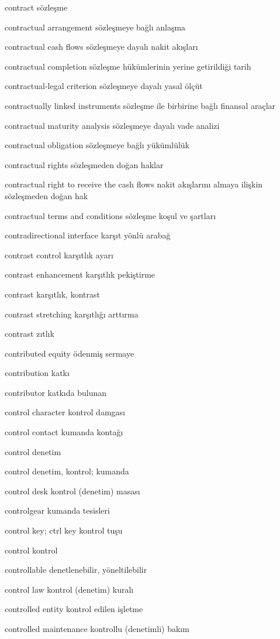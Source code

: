\documentclass[12pt,fleqn]{article}\usepackage{../../common}
\begin{document}
contract sözleşme

contractual arrangement sözleşmeye bağlı anlaşma

contractual cash flows sözleşmeye dayalı nakit akışları

contractual completion sözleşme hükümlerinin yerine getirildiği tarih

contractual-legal criterion sözleşmeye dayalı yasal ölçüt

contractually linked instruments sözleşme ile birbirine bağlı finansal araçlar

contractual maturity analysis sözleşmeye dayalı vade analizi

contractual obligation sözleşmeye bağlı yükümlülük

contractual rights sözleşmeden doğan haklar

contractual right to receive the cash flows nakit akışlarını almaya ilişkin sözleşmeden doğan hak

contractual terms and conditions sözleşme koşul ve şartları

contradirectional interface karşıt yönlü arabağ

contrast control karşıtlık ayarı

contrast enhancement karşıtlık pekiştirme

contrast karşıtlık, kontrast

contrast stretching karşıtlığı arttırma

contrast zıtlık

contributed equity ödenmiş sermaye

contribution katkı

contributor katkıda bulunan

control character kontrol damgası

control contact kumanda kontağı

control denetim

control denetim, kontrol; kumanda

control desk kontrol (denetim) masası

controlgear kumanda tesisleri

control key; ctrl key kontrol tuşu

control kontrol

controllable denetlenebilir, yöneltilebilir

control law kontrol (denetim) kuralı

controlled entity kontrol edilen işletme

controlled maintenance kontrollu (denetimli) bakım
\end{document}

